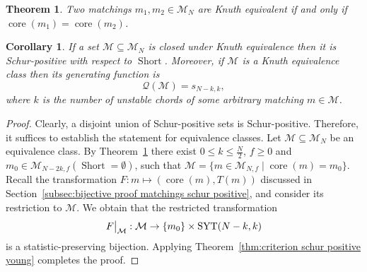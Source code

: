 \documentclass[11pt]{article}
\newtheorem{corollary}[theo]{Corollary}
\newtheorem{theorem}[theo]{Theorem}
\theoremstyle{definition}
\numberwithin{equation}{section}
\newcommand{\Syt}{\operatorname{SYT}}
\newcommand{\Short}{\operatorname{Short}}
\newcommand{\core}{\operatorname{core}}
\newcommand{\Q}{\mathcal{Q}}
\newcommand{\M}{\mathcal{M}}
\newcommand\restr[2]{{
  \left.\kern-\nulldelimiterspace 
  #1 
  \vphantom{\big|} 
  \right|_{#2} 
  }}
\begin{document}
\begin{theorem}
\label{thm:knuth like equivalent iff same core}
    Two matchings $m_1, m_2 \in \M_N$ are Knuth equivalent if and only if $\core(m_1) = \core(m_2)$.
\end{theorem}

\begin{corollary}
\label{cor:closed under knuth like is schur positive}
    If a set $\M \subseteq \M_N$ is closed under Knuth equivalence then it is Schur-positive with respect to $\Short$. Moreover, if $\M$ is a Knuth equivalence class then its generating function is
    \[
        \Q(\M) = s_{N-k,k},
    \]
    where $k$ is the number of unstable chords of some arbitrary matching $m \in \M$.
\end{corollary}

\begin{proof}
    Clearly, a disjoint union of Schur-positive sets is Schur-positive. Therefore, it suffices to establish the statement for equivalence classes. Let $\M \subseteq \M_N$ be an equivalence class. By Theorem~\ref{thm:knuth like equivalent iff same core} there exist $0 \le k \le \frac{N}{2}$, $f \ge 0$ and $m_0 \in \M_{N-2k,f}(\Short=\emptyset)$, such that $\M = \{m \in \M_{N,f} \mid \core(m) = m_0\}$. Recall the transformation $F:m \mapsto (\core(m),T(m))$ discussed in Section~\ref{subsec:bijective proof matchings schur positive}, and consider its restriction to $\M$. We obtain that the restricted transformation
    \[
        \restr{F}{\M}:\M \to \{m_0\} \times \Syt(N-k,k)
    \]
    is a statistic-preserving bijection. Applying Theorem~\ref{thm:criterion schur positive young} completes the proof.
\end{proof}
\end{document}
